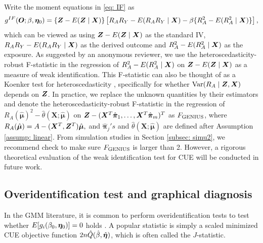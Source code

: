 \documentclass[12pt]{article}
\begin{document}
{Write the moment equations in \eqref{eq: IF} as 
$$
  g^{IF}(\bm O; \beta, \bm \eta_0) = \{ \bm{Z} - E( \bm Z \mid \bm{X}) \}  \left[ R_A R_Y - E(R_A R_Y \mid \bm{X}) - \beta \{R_A^2 -E(R_A^2 \mid \bm{X})   \}  \right],
$$ 
which can be viewed as using $ \bm{Z} - E( \bm Z \mid \bm{X})  $  as the standard IV, $R_A R_Y - E(R_A R_Y \mid \bm{X})$ as the derived outcome and  $R_A^2 - E(R_A^2 \mid \bm{X})$ as the exposure. {As suggested by an anonymous
reviewer,} we use the heteroscedasticity-robust F-statistic in the regression of $R_A^2 - E(R_A^2 \mid \bm{X})$ on $ \bm{Z} - E( \bm Z \mid \bm{X})  $ as a measure of weak identification. This F-statistic can also be thought of as a Koenker test for heteroscedasticity \citep{KOENKER1981}, specifically for whether $\mbox{Var} (R_A \mid \bm{Z} , \bm{X} )$ depends on $\bm{Z}$. {In practice, we replace the unknown quantities by their estimators and denote the heteroscedasticity-robust F-statistic in the regression of $ R_A (\hat{\bm \mu})^2  - \hat \theta (\bm X; \hat{\bm\mu})$ on $ \bm{Z} - (\bm{X}^T \hat{\bm\pi}_{1}, \dots, \bm{X}^T \hat{\bm\pi}_{m})^T  $ as $F_{\rm GENIUS}$, where $R_A (\hat{\bm \mu})= A - (\bm{X}^T, \bm{Z}^T)\hat{\bm \mu}, $ and $\hat{\bm\pi}_j's$ and $\hat \theta (\bm X; \hat{\bm\mu})$ are defined after Assumption \ref{assump: linear}.  {From simulation studies in Section \ref{subsec: simu2}, we recommend check to make sure $F_{\rm GENIUS}$ is larger than 2. However, a rigorous theoretical evaluation of the weak identification test for CUE will be conducted in future work. 
}}

\vspace{-3mm}

\subsection{Overidentification test and graphical diagnosis}
\label{subsec: overidentification}


{In the GMM literature, it is common to perform overidentification tests to test whether $E[g_i(\beta_0, \bm \eta_0)]=0$ holds \citep{Hansen:1982aa}. A popular statistic is simply a scaled minimized CUE objective function	$ 2n  \hat{Q} (\hat {{ \beta}}, \hat{\bm \eta}) $, which is often called the $J$-statistic. 
	



}}
\end{document}
